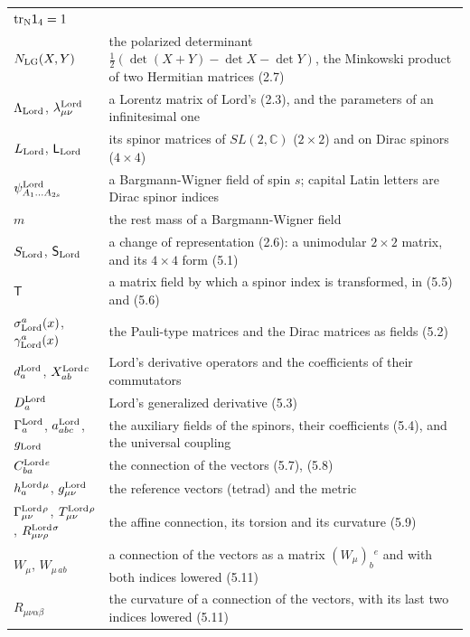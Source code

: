 \documentclass[
  10pt,
]{article}
\begin{document}
\begin{longtable}[]{@{}
  >{\raggedright\arraybackslash}p{}
  >{\raggedright\arraybackslash}p{}@{}}
\(\mathrm{tr}_{\rm N}\mathsf 1_4=1\) \\
\(N_{\rm LG}(X,Y)\) & the polarized determinant
\(\tfrac12(\det(X+Y)-\det X-\det Y)\), the Minkowski product of two
Hermitian matrices (2.7) \\
\(\Lambda_{\rm Lord}\), \(\lambda^{\rm Lord}_{\mu\nu}\) & a Lorentz
matrix of Lord's (2.3), and the parameters of an infinitesimal one \\
\(L_{\rm Lord}\), \(\mathsf L_{\rm Lord}\) & its spinor matrices of
\(SL(2,\mathbb C)\) (\(2\times2\)) and on Dirac spinors
(\(4\times4\)) \\
\(\psi^{\rm Lord}_{A_1\dots A_{2s}}\) & a Bargmann-Wigner field of spin
\(s\); capital Latin letters are Dirac spinor indices \\
\(m\) & the rest mass of a Bargmann-Wigner field \\
\(S_{\rm Lord}\), \(\mathsf S_{\rm Lord}\) & a change of representation
(2.6): a unimodular \(2\times2\) matrix, and its \(4\times4\) form
(5.1) \\
\(\mathsf T\) & a matrix field by which a spinor index is transformed,
in (5.5) and (5.6) \\
\(\sigma^a_{\rm Lord}(x)\), \(\gamma^a_{\rm Lord}(x)\) & the Pauli-type
matrices and the Dirac matrices as fields (5.2) \\
\(d^{\rm Lord}_a\), \(X^{\rm Lord}_{ab}{}^c\) & Lord's derivative
operators and the coefficients of their commutators \\
\(D^{\rm Lord}_a\) & Lord's generalized derivative (5.3) \\
\(\Gamma^{\rm Lord}_a\), \(a^{\rm Lord}_{abc}\), \(g_{\rm Lord}\) & the
auxiliary fields of the spinors, their coefficients (5.4), and the
universal coupling \\
\(C^{\rm Lord}_{ba}{}^e\) & the connection of the vectors (5.7),
(5.8) \\
\(h^{\rm Lord}_a{}^\mu\), \(g^{\rm Lord}_{\mu\nu}\) & the reference
vectors (tetrad) and the metric \\
\(\Gamma^{\rm Lord}_{\mu\nu}{}^\rho\), \(T^{\rm Lord}_{\mu\nu}{}^\rho\),
\(R^{\rm Lord}_{\mu\nu\rho}{}^\sigma\) & the affine connection, its
torsion and its curvature (5.9) \\
\(W_\mu\), \(W_{\mu\,ab}\) & a connection of the vectors as a matrix
\((W_\mu)_b{}^e\) and with both indices lowered (5.11) \\
\(R_{\mu\nu\alpha\beta}\) & the curvature of a connection of the
vectors, with its last two indices lowered (5.11) \\

\end{longtable}
\end{document}
